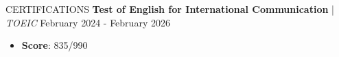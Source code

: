 \begin{rSection}{CERTIFICATIONS}
    \textbf{Test of English for International Communication} | \textit{ TOEIC } \hfill {February 2024 - February 2026}
    \begin{itemize}
        \itemsep 0pt {} \vspace{0.5em}
        \item \textbf{Score}: 835/990
    \end{itemize}        
\end{rSection}